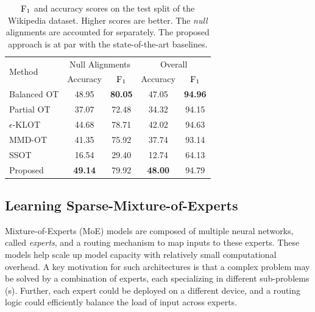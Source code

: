 \begin{table}
\caption[Evaluation of proposed Sparse-OT framework for the task aligning words in sentence pairs.]{$\rm{F}_1$ and accuracy scores on the test split of the Wikipedia dataset. Higher scores are better. The \textit{null} alignments are accounted for separately.
The proposed approach is at par with the state-of-the-art baselines. }
\label{table-word}
\centering
\begin{tabular}{lcccc}
\toprule
\multirow{2}{*}{Method} & \multicolumn{2}{c}{Null Alignments} & \multicolumn{2}{c}{Overall}\\
 &  Accuracy & $\rm{F}_1$ & Accuracy & $\rm{F}_1$\\
\midrule
    Balanced OT \citep{arase-etal-2023-unbalanced}  & {48.95} & \textbf{80.05} & {47.05} & \textbf{94.96}\\
    Partial OT \citep{arase-etal-2023-unbalanced} & 37.07 & 72.48 & 34.32 & 94.15\\
    $\epsilon$-KLOT \citep{arase-etal-2023-unbalanced} & 44.68 & 78.71 & 42.02 & 94.63\\
    MMD-OT \citep{mmd-uot} & 41.35 & 75.92 & 37.74 & 93.14\\
    SSOT \citep{blondel18a} & 16.54 & 29.40 & 12.74 & 64.13 \\
    \rowcolor{green!10}
    Proposed & \textbf{49.14} & {79.92} & \textbf{48.00} & {94.79}\\
\bottomrule
\end{tabular}
\end{table}

\subsection{Learning Sparse-Mixture-of-Experts}\label{colsparseexp}
Mixture-of-Experts (MoE) \citep{Jacobs1991AdaptiveMO,JordanandJacob,EigenRS13} models are composed of multiple neural networks, called \textit{experts}, and a routing mechanism to map inputs to these experts. These models help scale up model capacity with relatively small computational overhead. A key motivation for such architectures is that a complex problem may be solved by a combination of experts, each specializing in different sub-problems (s). Further, each expert could be deployed on a different device, and a routing logic could efficiently balance the load of input across experts.

